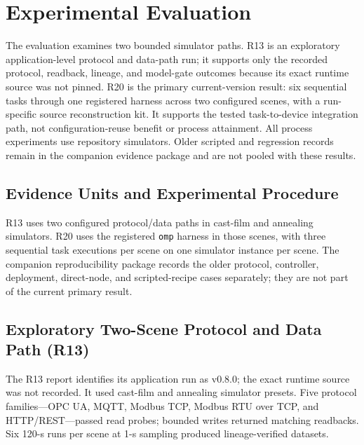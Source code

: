 \section{Experimental Evaluation}
\label{sec:eval}
The evaluation examines two bounded simulator paths. R13 is an exploratory
application-level protocol and data-path run; it supports only the recorded
protocol, readback, lineage, and model-gate outcomes because its exact runtime
source was not pinned. R20 is the primary current-version result: six
sequential tasks through one registered harness across two configured scenes,
with a run-specific source reconstruction kit. It supports the tested
task-to-device integration path, not configuration-reuse benefit or process
attainment. All process experiments use repository simulators. Older
scripted and regression records remain in the companion evidence package and
are not pooled with these results.

\subsection{Evidence Units and Experimental Procedure}
\label{sec:testbed}
\label{sec:procedure}
R13 uses two configured protocol/data paths in cast-film and annealing
simulators. R20 uses the registered \texttt{omp} harness in those scenes, with
three sequential task executions per scene on one simulator instance per
scene. The companion reproducibility package records the older protocol,
controller, deployment, direct-node, and scripted-recipe cases separately;
they are not part of the current primary result.

\subsection{Exploratory Two-Scene Protocol and Data Path (R13)}
\label{sec:crossscene}
The R13 report identifies its application run as v0.8.0; the exact runtime
source was not recorded. It used cast-film and annealing simulator presets.
Five protocol families---OPC UA, MQTT, Modbus TCP, Modbus
RTU over TCP, and HTTP/REST---passed read probes; bounded writes returned
matching readbacks. Six 120-s runs per scene at 1-s sampling produced
lineage-verified datasets.


